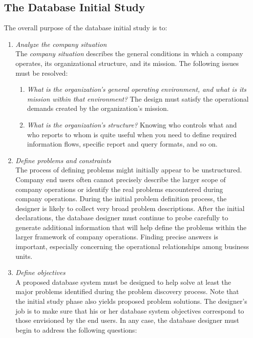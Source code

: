 \documentclass[a4paper, 12pt, titlepage]{report}
\begin{document}
\subsection{The Database Initial Study}
The overall purpose of the database initial study is to:
\begin{enumerate}
\item \emph{Analyze the company situation}\\ The \emph{company situation} describes the general conditions in which a company operates, its organizational structure, and its mission. The following issues must be resolved:
\begin{enumerate}
\item \emph{What is the organization’s general operating environment, and what is its mission within that environment?} The design must satisfy the operational demands created by the organization’s mission.
\item \emph{What is the organization’s structure?} Knowing who controls what and who reports to whom is quite useful when you need to define required information flows, specific report and query formats, and so on.
\end{enumerate}
\item \emph{Define problems and constraints} \\
The process of defining problems might initially appear to be unstructured. Company end users often cannot precisely describe the larger scope of company operations or identify the real problems encountered during company operations. During the initial problem definition process, the designer is likely to collect very broad problem descriptions. After the initial declarations, the database designer must continue to probe carefully to generate additional information that will help define the problems within the larger framework of company operations. Finding precise answers is important, especially concerning the operational relationships among business units.
\item \emph{Define objectives} \\
A proposed database system must be designed to help solve at least the major problems identified during the problem discovery process. Note that the initial study phase also yields proposed problem solutions. The designer’s job is to make sure that his or her database system objectives correspond to those envisioned by the end users. In any case, the database designer must begin to address the following questions:
\begin{itemize}

\end{itemize}
\end{enumerate}
\end{document}
